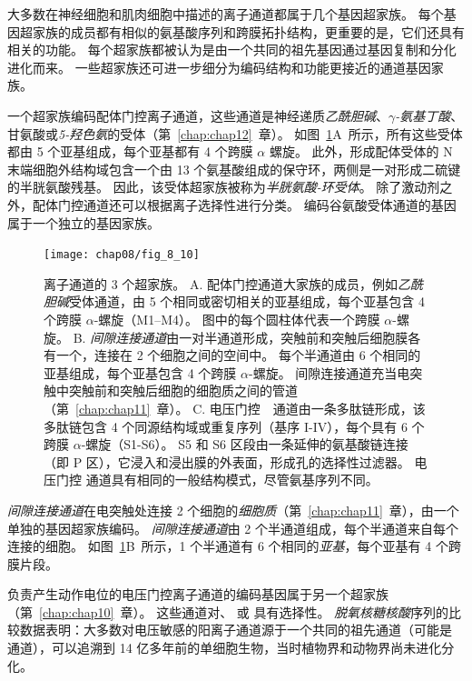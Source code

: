 大多数在神经细胞和肌肉细胞中描述的离子通道都属于几个基因超家族。
每个基因超家族的成员都有相似的氨基酸序列和跨膜拓扑结构，更重要的是，它们还具有相关的功能。
每个超家族都被认为是由一个共同的祖先基因通过基因复制和分化进化而来。
一些超家族还可进一步细分为编码结构和功能更接近的通道基因家族。


一个超家族编码配体门控离子通道，这些通道是神经递质\textit{乙酰胆碱}、\textit{$\gamma$-氨基丁酸}、甘氨酸或\textit{5-羟色氨}的受体（第~\ref{chap:chap12}~章）。 
如图~\ref{fig:8_10}A~所示，所有这些受体都由 5 个亚基组成，每个亚基都有 4 个跨膜 $\alpha$ 螺旋。
此外，形成配体受体的 N 末端细胞外结构域包含一个由 13 个氨基酸组成的保守环，两侧是一对形成二硫键的半胱氨酸残基。
因此，该受体超家族被称为\textit{半胱氨酸-环受体}。
除了激动剂之外，配体门控通道还可以根据离子选择性进行分类。
编码谷氨酸受体通道的基因属于一个独立的基因家族。


\begin{figure}[htbp]
	\centering
	\texttt{[image: chap08/fig\_8\_10]}
	\caption{离子通道的 3 个超家族。
		A. 配体门控通道大家族的成员，例如\textit{乙酰胆碱}受体通道，由 5 个相同或密切相关的亚基组成，每个亚基包含 4 个跨膜 $\alpha$-螺旋（M1–M4）。
		图中的每个圆柱体代表一个跨膜 $\alpha$-螺旋。
		B. \textit{间隙连接通道}由一对半通道形成，突触前和突触后细胞膜各有一个，连接在 2 个细胞之间的空间中。
		每个半通道由 6 个相同的亚基组成，每个亚基包含 4 个跨膜 $\alpha$-螺旋。
		间隙连接通道充当电突触中突触前和突触后细胞的细胞质之间的管道（第~\ref{chap:chap11}~章）。
		C. 电压门控~~通道由一条多肽链形成，该多肽链包含 4 个同源结构域或重复序列（基序 I-IV），每个具有 6 个跨膜 $\alpha$-螺旋（S1-S6）。
		S5 和 S6 区段由一条延伸的氨基酸链连接（即 P 区），它浸入和浸出膜的外表面，形成孔的选择性过滤器。
		电压门控  通道具有相同的一般结构模式，尽管氨基序列不同。}
	\label{fig:8_10}
\end{figure}




\textit{间隙连接通道}在电突触处连接 2 个细胞的\textit{细胞质}（第~\ref{chap:chap11}~章），由一个单独的基因超家族编码。
\textit{间隙连接通道}由 2 个半通道组成，每个半通道来自每个连接的细胞。
如图~\ref{fig:8_10}B~所示，1 个半通道有 6 个相同的\textit{亚基}，每个亚基有 4 个跨膜片段。


负责产生动作电位的电压门控离子通道的编码基因属于另一个超家族（第~\ref{chap:chap10}~章）。
这些通道对、 或  具有选择性。
\textit{脱氧核糖核酸}序列的比较数据表明：大多数对电压敏感的阳离子通道源于一个共同的祖先通道（可能是  通道），可以追溯到 14 亿多年前的单细胞生物，当时植物界和动物界尚未进化分化。


